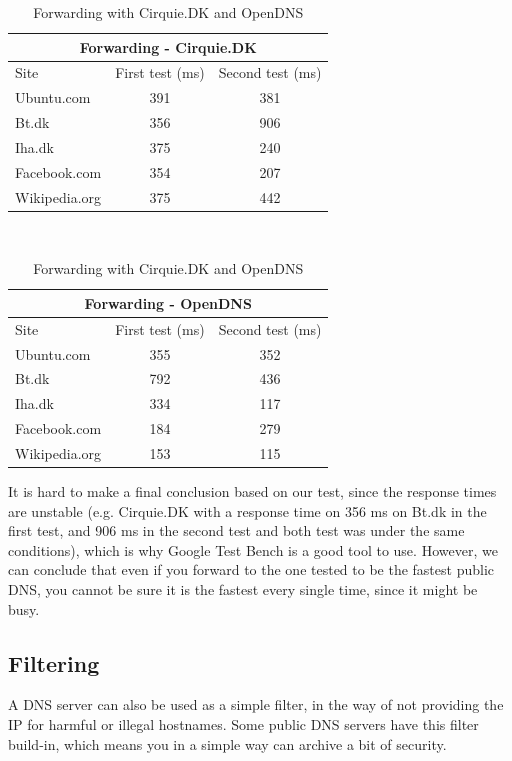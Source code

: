 \documentclass[Preamble]{subfiles}
\begin{document}
\begin{table}

\begin{center}
  \begin{tabular}{l|c|c}
    \multicolumn{3}{c}{Forwarding - Cirquie.DK}  \\
	\hline Site & First test (ms) & Second test (ms) \\ \hline
    Ubuntu.com & 391 & 381  \\ %
    Bt.dk & 356 & 906  \\ %
	Iha.dk & 375 & 240 \\ %
	Facebook.com & 354 &	207 \\ %
	Wikipedia.org & 375 & 442 \\ \hline
  \end{tabular}
\end{center}
~\\
\begin{center}
  \begin{tabular}{l|c|c}
    \multicolumn{3}{c}{Forwarding - OpenDNS}  \\
	\hline Site & First test (ms) & Second test (ms) \\     
    \hline
    Ubuntu.com & 355 & 352  \\ %
    Bt.dk & 792 & 436  \\ %
	Iha.dk & 334 & 117 \\ %
	Facebook.com & 184 & 279 \\ %
	Wikipedia.org & 153 & 115 \\ \hline
  \end{tabular}
\end{center}
\caption{Forwarding with Cirquie.DK and OpenDNS}
\label{tab:Forwarding}
\end{table}



It is hard to make a final conclusion based on our test, since the response times are unstable (e.g. Cirquie.DK with a response time on 356 ms on Bt.dk in the first test, and 906 ms in the second test and both test was under the same conditions), which is why Google Test Bench is a good tool to use. 
However, we can conclude that even if you forward to the one tested to be the fastest public DNS, you cannot be sure it is the fastest every single time, since it might be busy.




\subsection{Filtering}
A DNS server can also be used as a simple filter, in the way of not providing the IP for harmful or illegal hostnames. 
Some public DNS servers have this filter build-in, which means you in a simple way can archive a bit of security.
\end{document}
